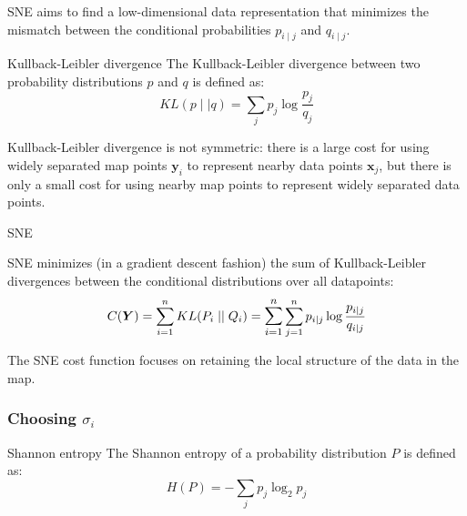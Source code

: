 \begin{marker}
	SNE aims to find a low-dimensional data representation that minimizes
	the mismatch between the conditional probabilities $p_{i \mid j}$ and $q_{i \mid j}$.
\end{marker}

\begin{definition}{Kullback-Leibler divergence}
	The Kullback-Leibler divergence between two probability distributions $p$ and $q$ is defined as:
	\begin{equation*}
		KL(p \mid\mid q) = \sum_{j} p_j \log \frac{p_j}{q_j}
	\end{equation*}
	\tcblower
	\begin{note}
		Kullback-Leibler divergence is not symmetric: there is a large
		cost for using widely separated map points $\boldsymbol y_i$ to
		represent nearby data points $\boldsymbol x_j$, but there is only a small
		cost for using nearby map points to represent widely separated data points.
	\end{note}
\end{definition}

\begin{problem}{SNE}{}

SNE minimizes (in a gradient descent fashion) the sum of Kullback-Leibler
divergences between the conditional distributions over all datapoints:
\begin{equation*}
	C(\boldsymbol Y) = \sum_{i=1}^n KL(P_i \mid\mid Q_i) =
	\mathlarger{\sum_{i=1}^n} \sum_{j=1}^n p_{i \mid j} \log \frac{p_{i \mid j}}{q_{i \mid j}}
\end{equation*}
\tcblower
\begin{note}
	The SNE cost function focuses on retaining the local structure of the data in
	the map.
\end{note}
\end{problem}

\subsubsection{Choosing $\sigma_i$}

\begin{definition}{Shannon entropy}{}
	The Shannon entropy of a probability distribution $P$ is defined as:
	\begin{equation*}
		H(P) = - \sum_{j} p_j \log_2 p_j
	\end{equation*}
\end{definition}

